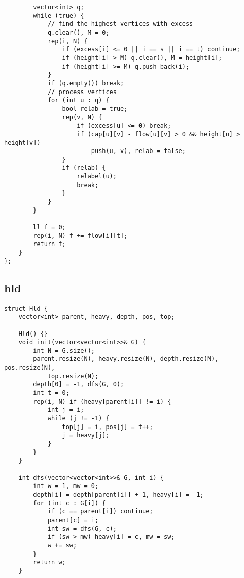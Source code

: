 \documentclass[twoside]{article}
\begin{document}
\begin{multicols*}{2}
\begin{verbatim}
        vector<int> q;
        while (true) {
            // find the highest vertices with excess
            q.clear(), M = 0;
            rep(i, N) {
                if (excess[i] <= 0 || i == s || i == t) continue;
                if (height[i] > M) q.clear(), M = height[i];
                if (height[i] >= M) q.push_back(i);
            }
            if (q.empty()) break;
            // process vertices
            for (int u : q) {
                bool relab = true;
                rep(v, N) {
                    if (excess[u] <= 0) break;
                    if (cap[u][v] - flow[u][v] > 0 && height[u] > height[v])
                        push(u, v), relab = false;
                }
                if (relab) {
                    relabel(u);
                    break;
                }
            }
        }

        ll f = 0;
        rep(i, N) f += flow[i][t];
        return f;
    }
};

\end{verbatim}

{
\subsection*{hld}
}
\begin{verbatim}
struct Hld {
    vector<int> parent, heavy, depth, pos, top;

    Hld() {}
    void init(vector<vector<int>>& G) {
        int N = G.size();
        parent.resize(N), heavy.resize(N), depth.resize(N), pos.resize(N),
            top.resize(N);
        depth[0] = -1, dfs(G, 0);
        int t = 0;
        rep(i, N) if (heavy[parent[i]] != i) {
            int j = i;
            while (j != -1) {
                top[j] = i, pos[j] = t++;
                j = heavy[j];
            }
        }
    }

    int dfs(vector<vector<int>>& G, int i) {
        int w = 1, mw = 0;
        depth[i] = depth[parent[i]] + 1, heavy[i] = -1;
        for (int c : G[i]) {
            if (c == parent[i]) continue;
            parent[c] = i;
            int sw = dfs(G, c);
            if (sw > mw) heavy[i] = c, mw = sw;
            w += sw;
        }
        return w;
    }


\end{verbatim}
\end{multicols*}
\end{document}
